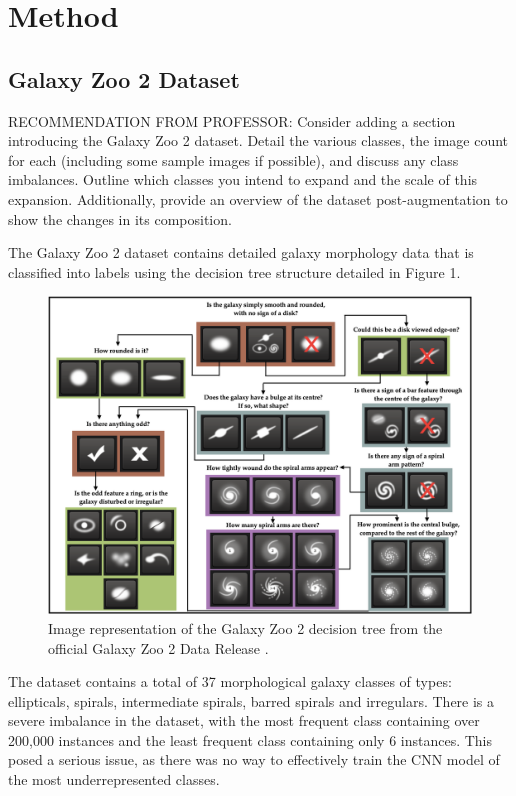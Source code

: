 \documentclass[10pt,twocolumn,letterpaper]{article}
\begin{document}
\section{Method}
\subsection{Galaxy Zoo 2 Dataset}
RECOMMENDATION FROM PROFESSOR:
Consider adding a section introducing the Galaxy Zoo 2 dataset. 
Detail the various classes, the image count for each (including some sample images if possible), and discuss any class imbalances. 
Outline which classes you intend to expand and the scale of this expansion. 
Additionally, provide an overview of the dataset post-augmentation to show the changes in its composition.

The Galaxy Zoo 2 dataset contains detailed galaxy morphology data that is classified into labels using the decision tree structure detailed in Figure 1.
\begin{figure}[htbp]
    \includegraphics[width=\linewidth]{decision_tree.png}
    \caption{Image representation of the Galaxy Zoo 2 decision tree from the official Galaxy Zoo 2 Data Release \cite{Willett13}.}
    \label{fig:decisiontree}
  \end{figure}

\noindent The dataset contains a total of 37 morphological galaxy classes of types: ellipticals, spirals, intermediate spirals, barred spirals and irregulars.
There is a severe imbalance in the dataset, with the most frequent class containing over 200,000 instances and the least frequent class containing only 6 instances.
This posed a serious issue, as there was no way to effectively train the CNN model of the most underrepresented classes.
\end{document}
